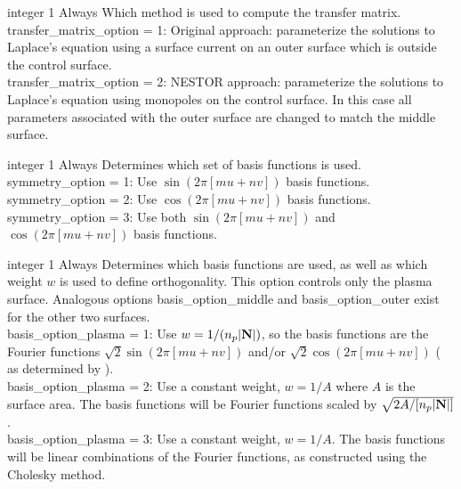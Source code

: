 \myhrule

{integer}
{1}
{Always}
{Which method is used to compute the transfer matrix.\\

{\ttfamily transfer\_matrix\_option} = 1: Original approach: parameterize the solutions to Laplace's equation using a surface current on an outer surface
which is outside the control surface.\\

{\ttfamily transfer\_matrix\_option} = 2: NESTOR approach: parameterize the solutions to Laplace's equation using monopoles on the control surface. In this case
all parameters associated with the outer surface are changed to match the middle surface.
}

\myhrule

{integer}
{1}
{Always}
{Determines which set of basis functions is used.\\

{\ttfamily symmetry\_option} = 1: Use $\sin(2 \pi [mu+nv])$ basis functions.\\

{\ttfamily symmetry\_option} = 2: Use $\cos(2 \pi [mu+nv])$ basis functions.\\

{\ttfamily symmetry\_option} = 3: Use both $\sin(2 \pi [mu+nv])$ and $\cos(2 \pi [mu+nv])$ basis functions.
}

\myhrule

{integer}
{1}
{Always}
{Determines which basis functions are used, as well as which weight $w$ is used to define orthogonality.
This option controls only the plasma surface. Analogous options {\ttfamily basis\_option\_middle} and {\ttfamily basis\_option\_outer}
exist for the other two surfaces.\\

{\ttfamily basis\_option\_plasma} = 1: Use $w = 1 / (n_p |{\mathbf N}|)$, so the basis functions
are the Fourier functions $\sqrt{2} \sin(2\pi[mu+nv])$ and/or $\sqrt{2} \cos(2\pi[mu+nv])$ (
as determined by ).\\

{\ttfamily basis\_option\_plasma} = 2: Use a constant weight, $w = 1/A$ where $A$ is the surface area. The basis functions
will be Fourier functions scaled by $\sqrt{2A/[n_p |{\mathbf N}|]}$.\\

{\ttfamily basis\_option\_plasma} = 3: Use a constant weight, $w = 1/A$. The basis functions
will be linear combinations of the Fourier functions, as constructed using the Cholesky method.
}

